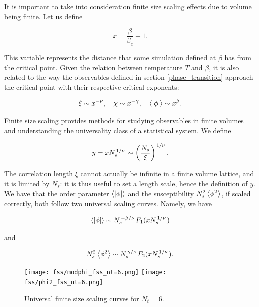 \documentclass[reqno,12pt]{article}
\numberwithin{equation}{section}
\begin{document}
It is important to take into consideration finite size scaling effects due to volume being finite.
Let us define

\begin{equation}
	x = \frac{\beta}{\beta_c} - 1.
\end{equation}

This variable represents the distance that some simulation defined at $\beta$ has from the critical point. Given
the relation between temperature $T$ and $\beta$, it is also related to the way the observables
defined in section \ref{phase_transition} approach the critical point with their respective critical exponents:

\begin{equation}
	\xi \sim x^{-\nu} \qc \chi \sim x^{-\gamma} \qc \expval{|\phi|} \sim x^{\beta}.
\end{equation}

Finite size scaling provides methods for studying observables in finite volumes and understanding the 
universality class of a statistical system. We define

\begin{equation}
	y = x N_s^{\flatfrac{1}{\nu}} \sim \qty(\frac{N_s}{\xi})^{\flatfrac{1}{\nu}}.
\end{equation}

The correlation length $\xi$ cannot actually be infinite in a finite volume lattice, and it is limited by $N_s$: 
it is thus useful to set a length scale, hence the definition of $y$. We have that the order parameter
$\expval{|\phi|}$ and the susceptibility $N_s^2 \expval{\phi^2}$, if scaled correctly, both follow
two universal scaling curves. Namely, we have

\begin{equation}
	\expval{|\phi|} \sim N_s^{\flatfrac{-\beta}{\nu}} F_1(x N_s^{\flatfrac{1}{\nu}})
\end{equation}

and 

\begin{equation}
	N_s^2 \expval{\phi^2} \sim N_s^{\flatfrac{\gamma}{\nu}} F_2(x N_s^{\flatfrac{1}{\nu}}).
\end{equation}

\begin{figure}[h]
	\centering
	\texttt{[image: fss/modphi\_fss\_nt=6.png]}
	\texttt{[image: fss/phi2\_fss\_nt=6.png]}
	\caption[Finite size scaling curve for $N_t = 6$]{Universal finite size scaling curves for $N_t = 6$.}
\label{fig:fss}
\end{figure}
\end{document}

